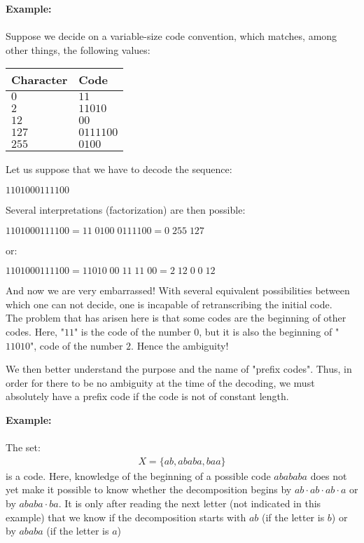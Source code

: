	\begin{tcolorbox}[colframe=black,colback=white,sharp corners]
	\textbf{{\Large {}}Example:}\\\\	
	Suppose we decide on a variable-size code convention, which matches, among other things, the following values:
	\begin{table}[H]
		\centering
		\begin{tabular}{|l|l|}
		\hline
		\rowcolor[HTML]{9B9B9B} 
		\textbf{Character} & \textbf{Code} \\ \hline
		$0$ & $11$ \\ \hline
		$2$ & $11010$ \\ \hline
		$12$ & $00$ \\ \hline
		$127$ & $0111100$ \\ \hline
		$255$ & $0100$ \\ \hline
		\end{tabular}
	\end{table}
	Let us suppose that we have to decode the sequence: 
	\begin{center}
		$1101000111100$
	\end{center}

	Several interpretations (factorization) are then possible:
	\begin{center}
		$1101000111100 = 11\; 0100\; 0111100 = 0\; 255\; 127$
	\end{center}
	or:
	\begin{center}
		$1101000111100 = 11010\; 00\; 11\; 11\; 00 = 2\; 12\; 0\; 0\; 12$
	\end{center}
	And now we are very embarrassed! With several equivalent possibilities between which one can not decide, one is incapable of retranscribing the initial code.\\

	The problem that has arisen here is that some codes are the beginning of other codes. Here, "$11$" is the code of the number $0$, but it is also the beginning of "$11010$", code of the number $2$. Hence the ambiguity!
	\end{tcolorbox}
	We then better understand the purpose and the name of "prefix codes". Thus, in order for there to be no ambiguity at the time of the decoding, we must absolutely have a prefix code if the code is not of constant length.
	\begin{tcolorbox}[colframe=black,colback=white,sharp corners]
	\textbf{{\Large {}}Example:}\\\\	
	The set:
	\begin{gather*}
		X=\{ab,ababa,baa\}
	\end{gather*}
	is a code. Here, knowledge of the beginning of a possible code $abababa$ does not yet make it possible to know whether the decomposition begins by $ab\cdot ab\cdot ab\cdot a$ or by $ababa\cdot ba$. It is only after reading the next letter (not indicated in this example) that we know if the decomposition starts with $ab$ (if the letter is $b$) or by $ababa$ (if the letter is $a$)
	\end{tcolorbox}
	
